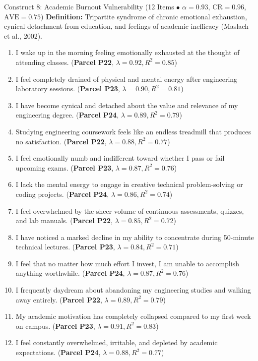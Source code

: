\documentclass[10pt,a4paper]{article}
\begin{document}
\vspace{0.2cm}
\begin{constructbox}{Construct 8: Academic Burnout Vulnerability (12 Items $\bullet$ $\alpha = 0.93$, $\text{CR} = 0.96$, $\text{AVE} = 0.75$)}
\textbf{Definition:} Tripartite syndrome of chronic emotional exhaustion, cynical detachment from education, and feelings of academic inefficacy (Maslach et al., 2002).
\begin{enumerate}[label=\textbf{Q\arabic*.}, leftmargin=2.5em, itemsep=2pt, resume]
  \item I wake up in the morning feeling emotionally exhausted at the thought of attending classes. \hfill (\textbf{Parcel P22}, $\lambda = 0.92, R^2 = 0.85$)
  \item I feel completely drained of physical and mental energy after engineering laboratory sessions. \hfill (\textbf{Parcel P23}, $\lambda = 0.90, R^2 = 0.81$)
  \item I have become cynical and detached about the value and relevance of my engineering degree. \hfill (\textbf{Parcel P24}, $\lambda = 0.89, R^2 = 0.79$)
  \item Studying engineering coursework feels like an endless treadmill that produces no satisfaction. \hfill (\textbf{Parcel P22}, $\lambda = 0.88, R^2 = 0.77$)
  \item I feel emotionally numb and indifferent toward whether I pass or fail upcoming exams. \hfill (\textbf{Parcel P23}, $\lambda = 0.87, R^2 = 0.76$)
  \item I lack the mental energy to engage in creative technical problem-solving or coding projects. \hfill (\textbf{Parcel P24}, $\lambda = 0.86, R^2 = 0.74$)
  \item I feel overwhelmed by the sheer volume of continuous assessments, quizzes, and lab manuals. \hfill (\textbf{Parcel P22}, $\lambda = 0.85, R^2 = 0.72$)
  \item I have noticed a marked decline in my ability to concentrate during 50-minute technical lectures. \hfill (\textbf{Parcel P23}, $\lambda = 0.84, R^2 = 0.71$)
  \item I feel that no matter how much effort I invest, I am unable to accomplish anything worthwhile. \hfill (\textbf{Parcel P24}, $\lambda = 0.87, R^2 = 0.76$)
  \item I frequently daydream about abandoning my engineering studies and walking away entirely. \hfill (\textbf{Parcel P22}, $\lambda = 0.89, R^2 = 0.79$)
  \item My academic motivation has completely collapsed compared to my first week on campus. \hfill (\textbf{Parcel P23}, $\lambda = 0.91, R^2 = 0.83$)
  \item I feel constantly overwhelmed, irritable, and depleted by academic expectations. \hfill (\textbf{Parcel P24}, $\lambda = 0.88, R^2 = 0.77$)
\end{enumerate}
\end{constructbox}
\end{document}
